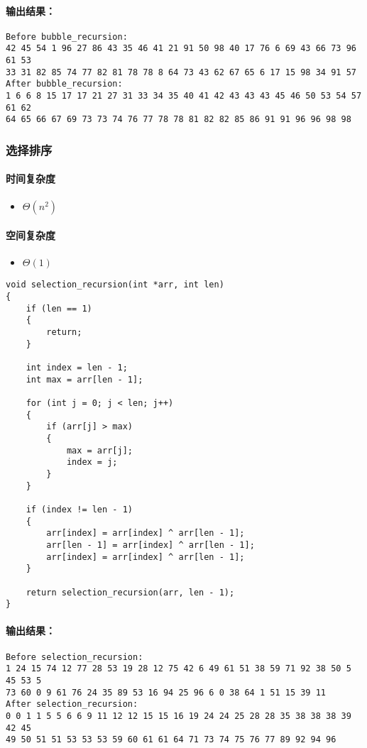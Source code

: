 \documentclass[UTF8]{ctexart}
\begin{document}
\paragraph{输出结果：}
\begin{lstlisting}
Before bubble_recursion:
42 45 54 1 96 27 86 43 35 46 41 21 91 50 98 40 17 76 6 69 43 66 73 96 61 53 
33 31 82 85 74 77 82 81 78 78 8 64 73 43 62 67 65 6 17 15 98 34 91 57 
After bubble_recursion:
1 6 6 8 15 17 17 21 27 31 33 34 35 40 41 42 43 43 43 45 46 50 53 54 57 61 62 
64 65 66 67 69 73 73 74 76 77 78 78 81 82 82 85 86 91 91 96 96 98 98
\end{lstlisting}
\subsubsection{选择排序}
\paragraph{时间复杂度}
\begin{itemize}
	\item $\Theta(n^2)$
\end{itemize}
\paragraph{空间复杂度}
\begin{itemize}
	\item $\Theta(1)$
\end{itemize}
\begin{lstlisting}
void selection_recursion(int *arr, int len)
{
	if (len == 1)
	{
		return;
	}

	int index = len - 1;
	int max = arr[len - 1];

	for (int j = 0; j < len; j++)
	{
		if (arr[j] > max)
		{
			max = arr[j];
			index = j;
		}
	}

	if (index != len - 1)
	{
		arr[index] = arr[index] ^ arr[len - 1];	
		arr[len - 1] = arr[index] ^ arr[len - 1];
		arr[index] = arr[index] ^ arr[len - 1];
	}	

	return selection_recursion(arr, len - 1);
}
\end{lstlisting}
\paragraph{输出结果：}
\begin{lstlisting}
Before selection_recursion:
1 24 15 74 12 77 28 53 19 28 12 75 42 6 49 61 51 38 59 71 92 38 50 5 45 53 5 
73 60 0 9 61 76 24 35 89 53 16 94 25 96 6 0 38 64 1 51 15 39 11 
After selection_recursion:
0 0 1 1 5 5 6 6 9 11 12 12 15 15 16 19 24 24 25 28 28 35 38 38 38 39 42 45 
49 50 51 51 53 53 53 59 60 61 61 64 71 73 74 75 76 77 89 92 94 96
\end{lstlisting}
\end{document}
